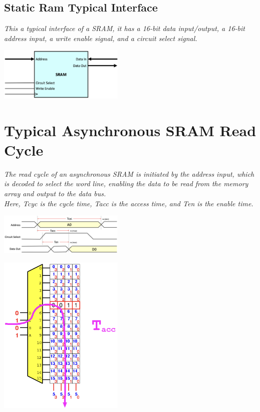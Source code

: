\subsection{Static Ram Typical Interface}
\textit{This a typical interface of a SRAM, it has a 16-bit data input/output, a 16-bit address input, a write enable signal, and a circuit select signal.}
\begin{center}
    \includegraphics[width=0.45\textwidth]{chapters/chapter1c/images/sram_interface.png}
\end{center}

\section{Typical Asynchronous SRAM Read Cycle}
\textit{The read cycle of an asynchronous SRAM is initiated by the address input, which is decoded to select the word line, enabling the data to be read from the memory array and output to the data bus.} \\ \vspace*{5px}
\textit{Here, Tcyc is the cycle time, Tacc is the access time, and Ten is the enable time.}

\begin{minipage}[htp]{0.45\textwidth}
    \begin{center}
        \includegraphics[width=0.45\textwidth]{chapters/chapter1c/images/sram_read.png}
    \end{center}
\end{minipage}
\hfill
\vline
\hfill
\begin{minipage}[htp]{0.45\textwidth}
    \begin{center}
        \includegraphics[width=0.45\textwidth]{chapters/chapter1c/images/sram_read2.png}
    \end{center}
\end{minipage}  

